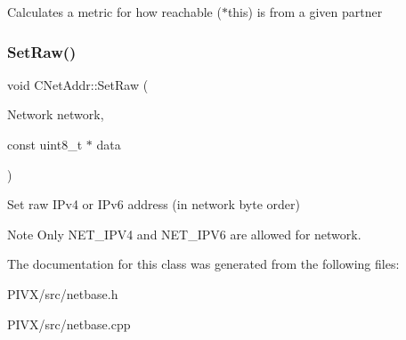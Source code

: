 Calculates a metric for how reachable ($\ast$this) is from a given partner \mbox{\label{class_c_net_addr_a1f0b23aca4ca78c11735d13f3583b7ad}} 
\subsubsection{\texorpdfstring{Set\+Raw()}{SetRaw()}}
{\footnotesize\ttfamily void C\+Net\+Addr\+::\+Set\+Raw (\begin{DoxyParamCaption}\item[{Network}]{network,  }\item[{const uint8\+\_\+t $\ast$}]{data }\end{DoxyParamCaption})}

Set raw I\+Pv4 or I\+Pv6 address (in network byte order) \begin{DoxyNote}{Note}
Only N\+E\+T\+\_\+\+I\+P\+V4 and N\+E\+T\+\_\+\+I\+P\+V6 are allowed for network. 
\end{DoxyNote}


The documentation for this class was generated from the following files\+:\begin{DoxyCompactItemize}
\item 
P\+I\+V\+X/src/netbase.\+h\item 
P\+I\+V\+X/src/netbase.\+cpp\end{DoxyCompactItemize}

